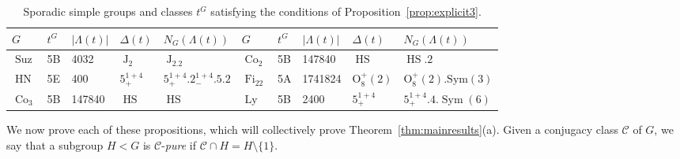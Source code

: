 \documentclass[11pt,a4paper]{amsart}
\theoremstyle{plain}
\theoremstyle{definition}
\theoremstyle{remark}
\theoremstyle{remark}
\theoremstyle{remark}
\theoremstyle{definition}
\DeclareMathOperator{\Ly}{Ly}
\DeclareMathOperator{\HN}{HN}
\DeclareMathOperator{\HS}{HS}
\DeclareMathOperator{\J}{J}
\DeclareMathOperator{\Suz}{Suz}
\DeclareMathOperator{\Co}{Co}
\DeclareMathOperator{\Fi}{Fi}
\DeclareMathOperator{\Sym}{Sym}
\begin{document}
\begin{table}[h]
\begin{center}
\begin{tabular}{|lllll|lllll|}\hline
$G$     & $t^G$ & $|\Lambda(t)|$ & $\Delta(t)$    & $N_G(\Lambda(t))$ & $G$      & $t^G$ & $|\Lambda(t)|$ & $\Delta(t)$            & $N_G(\Lambda(t))$                      \\\hline
$\Suz$  & 5B    & 4032        & $\J_2$      & $\J_2.2$       & $\Co_2$  & 5B    & 147840      & $\HS$               & $\HS.2$                             \\
$\HN$   & 5E    & 400         & $5^{1+4}_+$ &  $5^{1+4}_+.2^{1+4}_-.5.2$            & $\Fi_{22}$ & 5A    & 1741824     & $\mathrm{O}_8^+(2)$ & $\mathrm{O}_8^+(2).\mathrm{Sym}(3)$ \\
$\Co_3$ & 5B    & 147840      & $\HS$       & $\HS$          & $\Ly$     & 5B    & 2400        & $5^{1+4}_+$         & $5^{1+4}_+.4.\Sym(6)$              \\\hline
\end{tabular}%
\end{center}
\caption{Sporadic simple groups and classes $t^G$ satisfying the conditions of Proposition~\ref{prop:explicit3}.}
\label{tbl:prop3.3}
\end{table}

We now prove each of these propositions, which will collectively prove Theorem~\ref{thm:mainresults}(a). Given a conjugacy class $\mathcal{C}$ of $G$, we say that a subgroup $H<G$ is $\mathcal{C}$-\emph{pure} if $\mathcal{C}\cap H=H\setminus\{1\}$.
\end{document}
